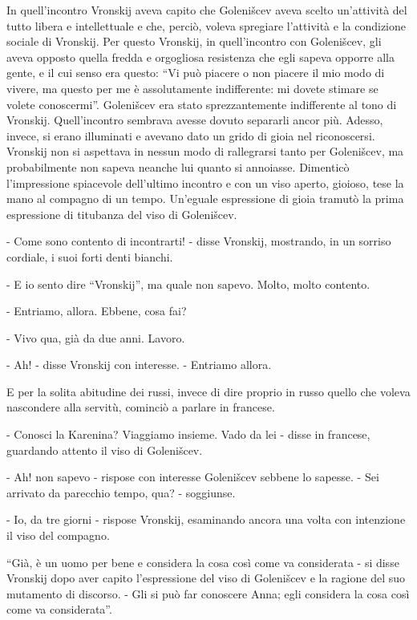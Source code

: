 In quell'incontro Vronskij aveva capito che Golenišcev aveva scelto un'attività del tutto libera e intellettuale e che, perciò, voleva spregiare l'attività e la condizione sociale di Vronskij. Per questo Vronskij, in quell'incontro con Golenišcev, gli aveva opposto quella fredda e orgogliosa resistenza che egli sapeva opporre alla gente, e il cui senso era questo: ``Vi può piacere o non piacere il mio modo di vivere, ma questo per me è assolutamente indifferente: mi dovete stimare se volete conoscermi''. Golenišcev era stato sprezzantemente indifferente al tono di Vronskij. Quell'incontro sembrava avesse dovuto separarli ancor più. Adesso, invece, si erano illuminati e avevano dato un grido di gioia nel riconoscersi. Vronskij non si aspettava in nessun modo di rallegrarsi tanto per Golenišcev, ma probabilmente non sapeva neanche lui quanto si annoiasse. Dimenticò l'impressione spiacevole dell'ultimo incontro e con un viso aperto, gioioso, tese la mano al compagno di un tempo. Un'eguale espressione di gioia tramutò la prima espressione di titubanza del viso di Golenišcev. 

- Come sono contento di incontrarti! - disse Vronskij, mostrando, in un sorriso cordiale, i suoi forti denti bianchi. 

- E io sento dire ``Vronskij'', ma quale non sapevo. Molto, molto contento. 

- Entriamo, allora. Ebbene, cosa fai? 

- Vivo qua, già da due anni. Lavoro. 

- Ah! - disse Vronskij con interesse. - Entriamo allora. 

E per la solita abitudine dei russi, invece di dire proprio in russo quello che voleva nascondere alla servitù, cominciò a parlare in francese. 

- Conosci la Karenina? Viaggiamo insieme. Vado da lei - disse in francese, guardando attento il viso di Golenišcev. 

- Ah! non sapevo - rispose con interesse Golenišcev sebbene lo sapesse. - Sei arrivato da parecchio tempo, qua? - soggiunse. 

- Io, da tre giorni - rispose Vronskij, esaminando ancora una volta con intenzione il viso del compagno. 

``Già, è un uomo per bene e considera la cosa così come va considerata - si disse Vronskij dopo aver capito l'espressione del viso di Golenišcev e la ragione del suo mutamento di discorso. - Gli si può far conoscere Anna; egli considera la cosa così come va considerata''. 

